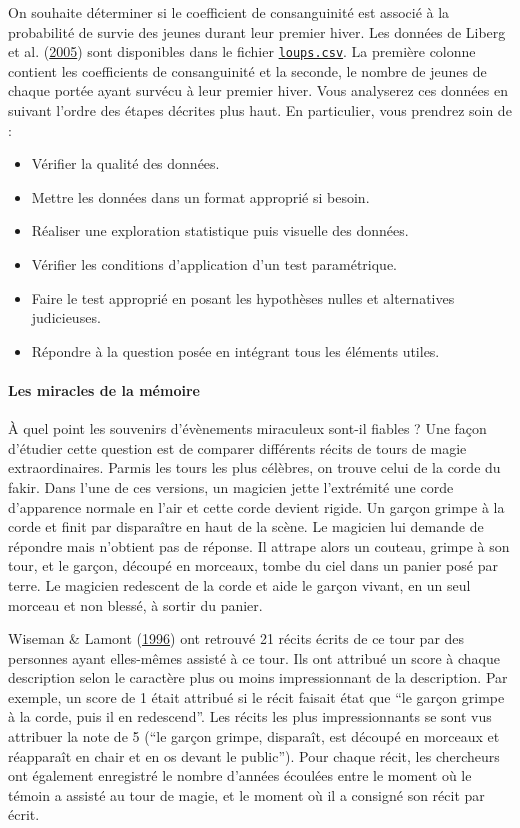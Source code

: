 \documentclass[a4paperpaper,]{article}
\providecommand{\tightlist}{%
  \setlength{\itemsep}{0pt}\setlength{\parskip}{0pt}}
\let\oldparagraph\paragraph
\renewcommand{\paragraph}[1]{\oldparagraph{#1}\mbox{}}
\begin{document}
On souhaite déterminer si le coefficient de consanguinité est associé à la probabilité de survie des jeunes durant leur premier hiver. Les données de Liberg et al. (\protect\hyperlink{ref-liberg2005}{2005}) sont disponibles dans le fichier \href{https://besibo.github.io/Biometrie3/data/loups.csv}{\texttt{loups.csv}}. La première colonne contient les coefficients de consanguinité et la seconde, le nombre de jeunes de chaque portée ayant survécu à leur premier hiver. Vous analyserez ces données en suivant l'ordre des étapes décrites plus haut. En particulier, vous prendrez soin de :

\begin{itemize}
\tightlist
\item
  Vérifier la qualité des données.
\item
  Mettre les données dans un format approprié si besoin.
\item
  Réaliser une exploration statistique puis visuelle des données.
\item
  Vérifier les conditions d'application d'un test paramétrique.
\item
  Faire le test approprié en posant les hypothèses nulles et alternatives judicieuses.
\item
  Répondre à la question posée en intégrant tous les éléments utiles.
\end{itemize}

\hypertarget{les-miracles-de-la-muxe9moire}{%
\paragraph{Les miracles de la mémoire}\label{les-miracles-de-la-muxe9moire}}

À quel point les souvenirs d'évènements miraculeux sont-il fiables ? Une façon d'étudier cette question est de comparer différents récits de tours de magie extraordinaires. Parmis les tours les plus célèbres, on trouve celui de la corde du fakir. Dans l'une de ces versions, un magicien jette l'extrémité une corde d'apparence normale en l'air et cette corde devient rigide. Un garçon grimpe à la corde et finit par disparaître en haut de la scène. Le magicien lui demande de répondre mais n'obtient pas de réponse. Il attrape alors un couteau, grimpe à son tour, et le garçon, découpé en morceaux, tombe du ciel dans un panier posé par terre. Le magicien redescent de la corde et aide le garçon vivant, en un seul morceau et non blessé, à sortir du panier.

Wiseman \& Lamont (\protect\hyperlink{ref-wiseman1996}{1996}) ont retrouvé 21 récits écrits de ce tour par des personnes ayant elles-mêmes assisté à ce tour. Ils ont attribué un score à chaque description selon le caractère plus ou moins impressionnant de la description. Par exemple, un score de 1 était attribué si le récit faisait état que ``le garçon grimpe à la corde, puis il en redescend''. Les récits les plus impressionnants se sont vus attribuer la note de 5 (``le garçon grimpe, disparaît, est découpé en morceaux et réapparaît en chair et en os devant le public'').
Pour chaque récit, les chercheurs ont également enregistré le nombre d'années écoulées entre le moment où le témoin a assisté au tour de magie, et le moment où il a consigné son récit par écrit.
\end{document}
